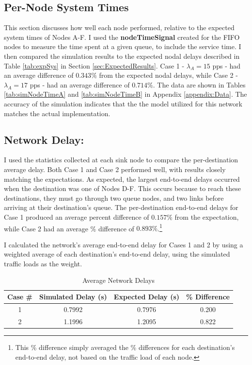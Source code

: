 \documentclass{article}
\begin{document}
\subsection{Per-Node System Times}
\label{subsec:systemTimes}
This section discusses how well each node performed, relative to the expected system times of Nodes A-F.
I used the \textbf{nodeTimeSignal} created for the FIFO nodes to measure the time spent at a given queue, to include the service time.
I then compared the simulation results to the expected nodal delays described in Table \ref{tab:expSys} in Section \ref{sec:ExpectedResults}.
Case 1 - $\lambda_A = 15$ pps - had an average difference of $0.343 \%$ from the expected nodal delays, while Case 2 - $\lambda_A = 17$ pps - had an average difference of $0.714\%$.
The data are shown in Tables \ref{tab:simNodeTimeA} and \ref{tab:simNodeTimeB} in Appendix \ref{appendix:Data}.
The accuracy of the simulation indicates that the the model utilized for this network matches the actual implementation.


\subsection{Network Delay:}
\label{subsec:NetworkDelay}
I used the statistics collected at each sink node to compare the per-destination average delay.
Both Case 1 and Case 2 performed well, with results closely matching the expectations.  
As expected, the largest end-to-end delays occurred when the destination was one of Nodes D-F. 
This occurs because to reach these destinations, they must go through two queue nodes, and two links before arriving at their destination's queue.
The per-destination end-to-end delays for Case 1 produced an average percent difference of $0.157\%$ from the expectation, while Case 2 had an average \% difference of $0.893\%$.\footnote{This \% difference simply averaged the \% differences for each destination's end-to-end delay, not based on the traffic load of each node.}

I calculated the network's average end-to-end delay for Cases 1 and 2 by using a weighted average of each destination's end-to-end delay, using the simulated traffic loads as the weight.

\begin{table}[h!]
\centering
\begin{tabular}{|c|c|c|c|} \hline
\textbf{Case \#} & \textbf{Simulated Delay (s)} & \textbf{Expected Delay (s)} & \textbf{\% Difference} \\ \hline
1 & 0.7992 & 0.7976 & 0.200 \\ \hline
2 & 1.1996 & 1.2095 & 0.822 \\ \hline
\end{tabular}
\caption{Average Network Delays}
\label{tab:lifetime}
\end{table}
\end{document}
